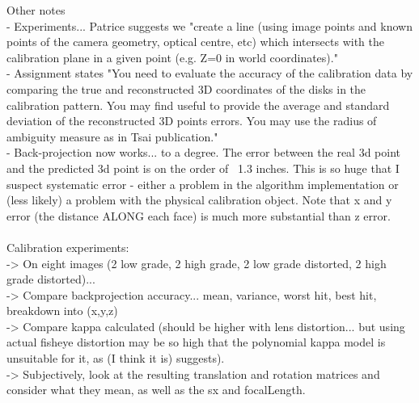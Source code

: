 Other notes\\
- Experiments... Patrice suggests we "create a line (using image points and known points of the camera geometry, optical centre, etc) which intersects with the calibration plane in a given point (e.g. Z=0 in world coordinates)."\\
- Assignment states "You need to evaluate the accuracy of the calibration data by comparing the true and reconstructed 3D coordinates of the disks in the calibration pattern. You may find useful to provide the average and standard deviation of the reconstructed 3D points errors. You may use the radius of ambiguity measure as in Tsai publication."\\
- Back-projection now works... to a degree. The error between the real 3d point and the predicted 3d point is on the order of ~1.3 inches. This is so huge that I suspect systematic error - either a problem in the algorithm implementation or (less likely) a problem with the physical calibration object. Note that x and y error (the distance ALONG each face) is much more substantial than z error.\\
\\
Calibration experiments:\\
-> On eight images (2 low grade, 2 high grade, 2 low grade distorted, 2 high grade distorted)...\\
-> Compare backprojection accuracy... mean, variance, worst hit, best hit, breakdown into (x,y,z) \\
-> Compare kappa calculated (should be higher with lens distortion... but using actual fisheye distortion may be so high that the polynomial kappa model is unsuitable for it, as \cite{straightlines} (I think it is) suggests).\\
-> Subjectively, look at the resulting translation and rotation matrices and consider what they mean, as well as the sx and focalLength.\\

